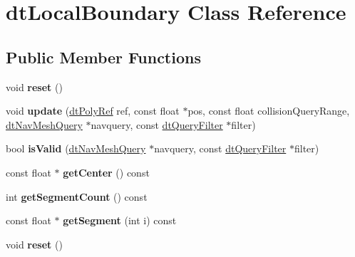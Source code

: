 \hypertarget{classdtLocalBoundary}{}\section{dt\+Local\+Boundary Class Reference}
\label{classdtLocalBoundary}
\subsection*{Public Member Functions}
\begin{DoxyCompactItemize}
\item 
\mbox{\label{classdtLocalBoundary_a2a3911b20edb27140857289dd2eea76c}} 
void {\bfseries reset} ()
\item 
\mbox{\label{classdtLocalBoundary_a270ef7f2e72520df6bd5c3a0e6b9a869}} 
void {\bfseries update} (\hyperlink{group__detour_gab4e0b2257a670c1a800057999612b466}{dt\+Poly\+Ref} ref, const float $\ast$pos, const float collision\+Query\+Range, \hyperlink{classdtNavMeshQuery}{dt\+Nav\+Mesh\+Query} $\ast$navquery, const \hyperlink{classdtQueryFilter}{dt\+Query\+Filter} $\ast$filter)
\item 
\mbox{\label{classdtLocalBoundary_add9a50788d1294903c1fdf98f440dfd1}} 
bool {\bfseries is\+Valid} (\hyperlink{classdtNavMeshQuery}{dt\+Nav\+Mesh\+Query} $\ast$navquery, const \hyperlink{classdtQueryFilter}{dt\+Query\+Filter} $\ast$filter)
\item 
\mbox{\label{classdtLocalBoundary_ab89e6bc9a4985f2c25e97fb1f70b6060}} 
const float $\ast$ {\bfseries get\+Center} () const
\item 
\mbox{\label{classdtLocalBoundary_a051ee9bba1b9e3bb563735d9ec047c7f}} 
int {\bfseries get\+Segment\+Count} () const
\item 
\mbox{\label{classdtLocalBoundary_a25ca9796be0ec6ff775a56f911c3fa17}} 
const float $\ast$ {\bfseries get\+Segment} (int i) const
\item 
\mbox{\label{classdtLocalBoundary_a2a3911b20edb27140857289dd2eea76c}} 
void {\bfseries reset} ()
\item 

\end{DoxyCompactItemize}
